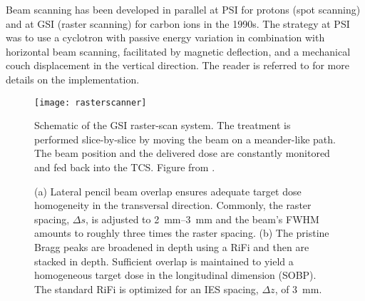 Beam scanning has been developed in parallel at \ac{PSI} for protons
(spot scanning) and at \ac{GSI} (raster scanning) for carbon ions in
the 1990s. The strategy at \ac{PSI} was to use a cyclotron with
passive energy variation in combination with horizontal beam scanning,
facilitated by magnetic deflection, and a mechanical couch
displacement in the vertical direction. The reader is referred to
\citet{Pedroni1995} for more details on the implementation.

%
%
\begin{figure}[tbp]
  \centering
  \texttt{[image: rasterscanner]}
  \caption[Schematic of the \ac{GSI} raster-scan system.]{Schematic of
    the \ac{GSI} raster-scan system. The treatment is performed
    slice-by-slice by moving the beam on a meander-like path. The beam
    position and the delivered dose are constantly monitored and fed back
    into the \acl{TCS}. Figure from \citet{Kraemer2009}.}
  \label{fig:background:active}
\end{figure}
\begin{figure}[tbp]
  \centering
  \caption[Use of lateral and longitudinal beam overlap in the raster
  scanning technique.]{(a) Lateral pencil beam overlap ensures
    adequate target dose homogeneity in the transversal
    direction. Commonly, the raster spacing, $\Delta s$, is adjusted
    to \SIrange{2}{3}{\milli\meter} and the beam's \ac{FWHM} amounts
    to roughly three times the raster spacing. (b) The pristine
    Bragg peaks are broadened in depth using a \acf{RiFi} and then are
    stacked in depth. Sufficient overlap is maintained to yield a
    homogeneous target dose in the longitudinal dimension (\ac{SOBP}).
    The standard \ac{RiFi} is optimized for an \ac{IES} spacing,
    $\Delta z$, of \SI{3}{\milli\meter}.  }
  \label{fig:background:overlap}
\end{figure}

